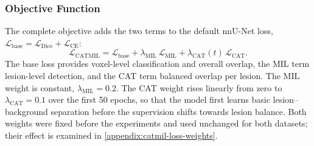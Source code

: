 \subsubsection{Objective Function}

The complete objective adds the two terms to the default nnU-Net loss,
$\mathcal{L}_{\mathrm{base}} = \mathcal{L}_{\mathrm{Dice}} + \mathcal{L}_{\mathrm{CE}}$:
\begin{equation}
\mathcal{L}_{\mathrm{CATMIL}}
=
\mathcal{L}_{\mathrm{base}}
+
\lambda_{\mathrm{MIL}}\, \mathcal{L}_{\mathrm{MIL}}
+
\lambda_{\mathrm{CAT}}(t)\, \mathcal{L}_{\mathrm{CAT}} .
\label{eq:sl_catmil_loss}
\end{equation}
The base loss provides voxel-level classification and overall overlap, the
MIL term lesion-level detection, and the CAT term balanced overlap per
lesion. The MIL weight is
constant, $\lambda_{\mathrm{MIL}}=0.2$. The CAT weight rises linearly from zero to $\lambda_{\mathrm{CAT}}=0.1$ over
the first 50 epochs, so that the model first learns basic lesion--background
separation before the supervision shifts towards lesion balance. Both
weights were fixed before the experiments and used unchanged for both
datasets; their effect is examined in \cref{appendix:catmil-loss-weights}.
